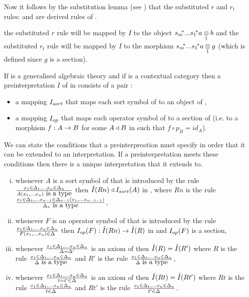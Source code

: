 Now it follows by the substitution lemma (see \cite{Cartmell86})
that the substituted $r$ and $r_t$ rules: 
and   are derived rules of \gatU. 

the substituted $r$ rule will be mapped by $I$ to the object $\smstar...\sonestar\crossx{a}{b}{1}$ and the substituted $r_t$ rule will
be mapped by $I$ to the morphism  $\smstar...\sonestar\crossx{a}{g}{1}$ (which is defined since $g$ is a section).

\newpage
\note
{}
If \gatU is a generalised algebraic theory  and if \catcw is a contextual category then
a preinterpretation $I$ of  \gatU in \catcw consists of a pair :
\begin{itemize}
\item a mapping $\Isort$ that maps each sort symbol of \gatUw to  an object of \catc,
\item a mapping $\Iop$ that maps each operator symbol of \gatUw to a section of \catcw (i.e. to a morphism $f: A \morph B$ for some 
$A \base B$ in \catcw such that $f \circ p_B=id_A$).
\end{itemize}

\note We can state the conditions that a preinterpreation must specify in order that it can be extended to an interpretation.
If a preinterpretation meets these conditions then there is a unique interpretation that it extends to.
\begin{enumerate}[(i)]
\setlength\itemindent{2cm}
\item
whenever $A$ is a sort symbol of \gatUw that is introduced by the rule
$\frac{\xDelta{n}}{\isT{A(\xn)}}$
then $\Ihat(Rn) \base \Isort(A)$ in \catc, where $Rn$ is the rule
$\frac{\context{x}{\Delta}{n-1}}{\isT{\Delta_n}}$,
\item
whenever $F$ is an operator symbol of \gatUw that is introduced by the rule
$\frac{\xDelta{n}}{\ofT{F(\xn)}{\Delta}}$
then $\Iop(F) : \Ihat(Rn) \morph \Ihat(R)$  in \catcw and $\Iop(F)$ is a section,
\item whenever
$\frac{\xDelta{n}}{\Delta = \Delta'}$
is an axiom of \gatUw then $\Ihat(R) = \Ihat(R')$
where $R$ is the rule
$\frac{\xDelta{n}}{\isT{\Delta}}$
and $R'$ is the rule
$\frac{\xDelta{n}}{\isT{\Delta}}$,
\item whenever
$\frac{\xDelta{n}}{t = t' \in \Delta}$
is an axiom of \gatUw then $\Ihat(Rt) = \Ihat(Rt')$
where $Rt$ is the rule
$\frac{\xDelta{n}}{\ofT{t}{\Delta}}$
and $Rt'$ is the rule
$\frac{\xDelta{n}}{\ofT{t'}{\Delta}}$.
\end{enumerate}


